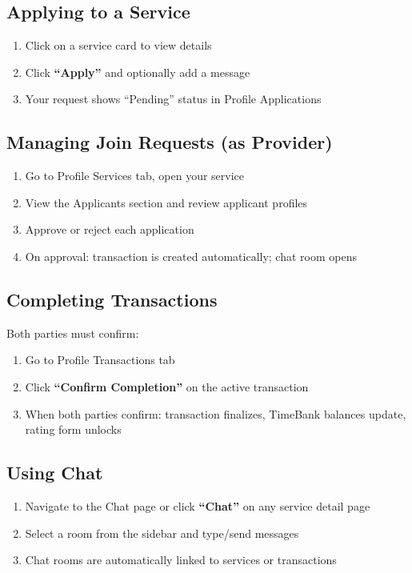 \documentclass[10pt,a4paper]{report}
\begin{document}
\subsection{Applying to a Service}

\begin{enumerate}
    \item Click on a service card to view details
    \item Click \textbf{``Apply''} and optionally add a message
    \item Your request shows ``Pending'' status in Profile \textrightarrow{} Applications
\end{enumerate}

\subsection{Managing Join Requests (as Provider)}

\begin{enumerate}
    \item Go to Profile \textrightarrow{} Services tab, open your service
    \item View the Applicants section and review applicant profiles
    \item Approve or reject each application
    \item On approval: transaction is created automatically; chat room opens
\end{enumerate}

\subsection{Completing Transactions}

Both parties must confirm:

\begin{enumerate}
    \item Go to Profile \textrightarrow{} Transactions tab
    \item Click \textbf{``Confirm Completion''} on the active transaction
    \item When both parties confirm: transaction finalizes, TimeBank balances update, rating form unlocks
\end{enumerate}

\subsection{Using Chat}

\begin{enumerate}
    \item Navigate to the Chat page or click \textbf{``Chat''} on any service detail page
    \item Select a room from the sidebar and type/send messages
    \item Chat rooms are automatically linked to services or transactions
\end{enumerate}
\end{document}
